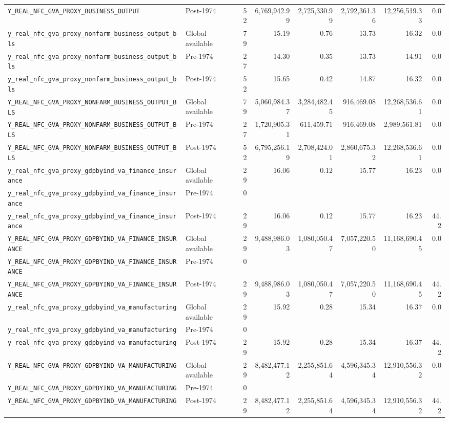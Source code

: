 \begin{landscape}
\begin{longtable}{p{4.4cm}p{3.8cm}rrrrrr}
\\
\nolinkurl{Y_REAL_NFC_GVA_PROXY_BUSINESS_OUTPUT} & Post-1974 & 52 & 6,769,942.99 & 2,725,330.99 & 2,792,361.36 & 12,256,519.33 & 0.0
\\
\nolinkurl{y_real_nfc_gva_proxy_nonfarm_business_output_bls} & Global available & 79 & 15.19 & 0.76 & 13.73 & 16.32 & 0.0
\\
\nolinkurl{y_real_nfc_gva_proxy_nonfarm_business_output_bls} & Pre-1974 & 27 & 14.30 & 0.35 & 13.73 & 14.91 & 0.0
\\
\nolinkurl{y_real_nfc_gva_proxy_nonfarm_business_output_bls} & Post-1974 & 52 & 15.65 & 0.42 & 14.87 & 16.32 & 0.0
\\
\nolinkurl{Y_REAL_NFC_GVA_PROXY_NONFARM_BUSINESS_OUTPUT_BLS} & Global available & 79 & 5,060,984.37 & 3,284,482.45 & 916,469.08 & 12,268,536.61 & 0.0
\\
\nolinkurl{Y_REAL_NFC_GVA_PROXY_NONFARM_BUSINESS_OUTPUT_BLS} & Pre-1974 & 27 & 1,720,905.31 & 611,459.71 & 916,469.08 & 2,989,561.81 & 0.0
\\
\nolinkurl{Y_REAL_NFC_GVA_PROXY_NONFARM_BUSINESS_OUTPUT_BLS} & Post-1974 & 52 & 6,795,256.19 & 2,708,424.01 & 2,860,675.32 & 12,268,536.61 & 0.0
\\
\nolinkurl{y_real_nfc_gva_proxy_gdpbyind_va_finance_insurance} & Global available & 29 & 16.06 & 0.12 & 15.77 & 16.23 & 0.0
\\
\nolinkurl{y_real_nfc_gva_proxy_gdpbyind_va_finance_insurance} & Pre-1974 & 0 &  &  &  &  &
\\
\nolinkurl{y_real_nfc_gva_proxy_gdpbyind_va_finance_insurance} & Post-1974 & 29 & 16.06 & 0.12 & 15.77 & 16.23 & 44.2
\\
\nolinkurl{Y_REAL_NFC_GVA_PROXY_GDPBYIND_VA_FINANCE_INSURANCE} & Global available & 29 & 9,488,986.03 & 1,080,050.47 & 7,057,220.50 & 11,168,690.45 & 0.0
\\
\nolinkurl{Y_REAL_NFC_GVA_PROXY_GDPBYIND_VA_FINANCE_INSURANCE} & Pre-1974 & 0 &  &  &  &  &
\\
\nolinkurl{Y_REAL_NFC_GVA_PROXY_GDPBYIND_VA_FINANCE_INSURANCE} & Post-1974 & 29 & 9,488,986.03 & 1,080,050.47 & 7,057,220.50 & 11,168,690.45 & 44.2
\\
\nolinkurl{y_real_nfc_gva_proxy_gdpbyind_va_manufacturing} & Global available & 29 & 15.92 & 0.28 & 15.34 & 16.37 & 0.0
\\
\nolinkurl{y_real_nfc_gva_proxy_gdpbyind_va_manufacturing} & Pre-1974 & 0 &  &  &  &  &
\\
\nolinkurl{y_real_nfc_gva_proxy_gdpbyind_va_manufacturing} & Post-1974 & 29 & 15.92 & 0.28 & 15.34 & 16.37 & 44.2
\\
\nolinkurl{Y_REAL_NFC_GVA_PROXY_GDPBYIND_VA_MANUFACTURING} & Global available & 29 & 8,482,477.12 & 2,255,851.64 & 4,596,345.34 & 12,910,556.32 & 0.0
\\
\nolinkurl{Y_REAL_NFC_GVA_PROXY_GDPBYIND_VA_MANUFACTURING} & Pre-1974 & 0 &  &  &  &  &
\\
\nolinkurl{Y_REAL_NFC_GVA_PROXY_GDPBYIND_VA_MANUFACTURING} & Post-1974 & 29 & 8,482,477.12 & 2,255,851.64 & 4,596,345.34 & 12,910,556.32 & 44.2
\\
\bottomrule
\end{longtable}
\end{landscape}

